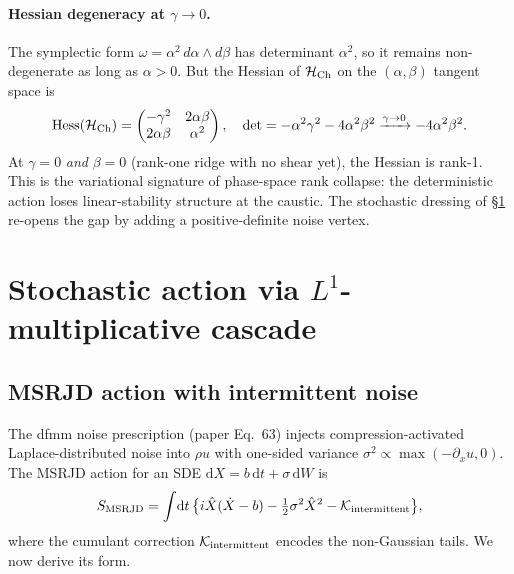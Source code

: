 \documentclass[11pt]{article}
\newcommand{\dd}{\mathrm{d}}
\begin{document}
\paragraph{Hessian degeneracy at $\gamma\to 0$.} The symplectic form
$\omega = \alpha^2\,d\alpha\wedge d\beta$ has determinant $\alpha^2$,
so it remains non-degenerate as long as $\alpha > 0$. But the Hessian
of $\mathcal{H}_{\rm Ch}$ on the $(\alpha,\beta)$ tangent space is
\begin{equation}
  \mathrm{Hess}(\mathcal{H}_{\rm Ch}) = \begin{pmatrix} -\gamma^2 & 2\alpha\beta \\ 2\alpha\beta & \alpha^2 \end{pmatrix},\quad
  \det = -\alpha^2\gamma^2 - 4\alpha^2\beta^2 \xrightarrow{\gamma\to 0} -4\alpha^2\beta^2.
\end{equation}
At $\gamma=0$ \emph{and} $\beta=0$ (rank-one ridge with no shear yet), the
Hessian is rank-1. This is the variational signature of phase-space rank
collapse: the deterministic action loses linear-stability structure at
the caustic. The stochastic dressing of \S\ref{sec:noise} re-opens the
gap by adding a positive-definite noise vertex.

\section{Stochastic action via $L^1$-multiplicative cascade}
\label{sec:noise}

\subsection{MSRJD action with intermittent noise}
The dfmm noise prescription (paper Eq.~63) injects compression-activated
Laplace-distributed noise into $\rho u$ with one-sided variance
$\sigma^2 \propto \max(-\partial_x u, 0)$. The MSRJD action for an
SDE $\dd X = b\,\dd t + \sigma\,\dd W$ is
\begin{equation}
  S_{\rm MSRJD} = \int\!\dd t\,\bigl\{i\hat X(\dot X - b) - \tfrac{1}{2}\sigma^2 \hat X^2 - \mathcal{K}_{\rm intermittent}\bigr\},
\end{equation}
where the cumulant correction $\mathcal{K}_{\rm intermittent}$ encodes
the non-Gaussian tails. We now derive its form.
\end{document}
